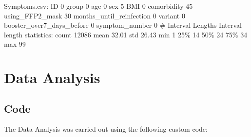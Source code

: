 \documentclass[11pt]{article}
\begin{document}
\begin{codeoutput}
Symptoms.csv: ID                            0
group                         0
age                           0
sex                           5
BMI                           0
comorbidity                  45
using\_FFP2\_mask              30
months\_until\_reinfection      0
variant                       0
booster\_over7\_days\_before     0
symptom\_number                0
\# Interval Lengths
Interval length statistics: count   12086
mean    32.01
std     26.43
min         1
25\%        14
50\%        24
75\%        34
max        99
\end{codeoutput}

\section{Data Analysis}
\subsection{{Code}}
The Data Analysis was carried out using the following custom code:
\end{document}
